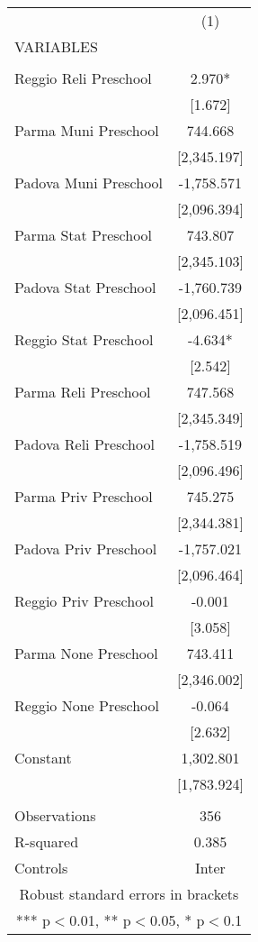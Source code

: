 \begin{tabular}{lc} \hline
 & (1) \\
VARIABLES &  \\ \hline
 &  \\
Reggio Reli Preschool & 2.970* \\
 & [1.672] \\
Parma Muni Preschool & 744.668 \\
 & [2,345.197] \\
Padova Muni Preschool & -1,758.571 \\
 & [2,096.394] \\
Parma Stat Preschool & 743.807 \\
 & [2,345.103] \\
Padova Stat Preschool & -1,760.739 \\
 & [2,096.451] \\
Reggio Stat Preschool & -4.634* \\
 & [2.542] \\
Parma Reli Preschool & 747.568 \\
 & [2,345.349] \\
Padova Reli Preschool & -1,758.519 \\
 & [2,096.496] \\
Parma Priv Preschool & 745.275 \\
 & [2,344.381] \\
Padova Priv Preschool & -1,757.021 \\
 & [2,096.464] \\
Reggio Priv Preschool & -0.001 \\
 & [3.058] \\
Parma None Preschool & 743.411 \\
 & [2,346.002] \\
Reggio None Preschool & -0.064 \\
 & [2.632] \\
Constant & 1,302.801 \\
 & [1,783.924] \\
 &  \\
Observations & 356 \\
R-squared & 0.385 \\
 Controls & Inter \\ \hline
\multicolumn{2}{c}{ Robust standard errors in brackets} \\
\multicolumn{2}{c}{ *** p$<$0.01, ** p$<$0.05, * p$<$0.1} \\
\end{tabular}
